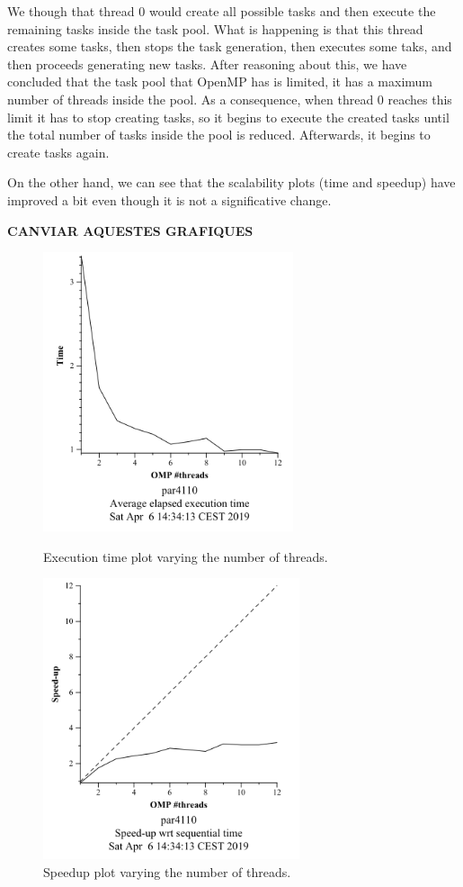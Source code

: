 \documentclass[12pt, a4paper]{article}
\begin{document}
We though that thread 0 would create all possible tasks and then execute the remaining tasks inside the task pool. What is happening is that this thread creates some tasks, then stops the task generation, then executes some taks, and then proceeds generating new tasks. After reasoning about this, we have concluded that the task pool that OpenMP has is limited, it has a maximum number of threads inside the pool. As a consequence, when thread 0 reaches this limit it has to stop creating tasks, so it begins to execute the created tasks until the total number of tasks inside the pool is reduced. Afterwards, it begins to create tasks again.

On the other hand, we can see that the scalability plots (time and speedup) have improved a bit even though it is not a significative change.

\textbf{\large{\large{CANVIAR AQUESTES GRAFIQUES}}}
\begin{figure}[H]
\centering
\begin{minipage}[b]{0.4\linewidth}
  \centering
  \includegraphics[scale=0.95]{./mandel-omp-10000-strong-22-2-time}
  \caption{Execution time plot varying the number of threads.}
  \label{fig:mandel-omp-10000-strong-22-2-time}
\end{minipage}%
\hspace{0.5cm}
\begin{minipage}[b]{0.4\linewidth}
  \centering
  \includegraphics[scale=0.95]{./mandel-omp-10000-strong-22-2-speedup}
  \caption{Speedup plot varying the number of threads.}
  \label{fig:mandel-omp-10000-strong-22-2-speedup}
\end{minipage}
\end{figure}
\end{document}
